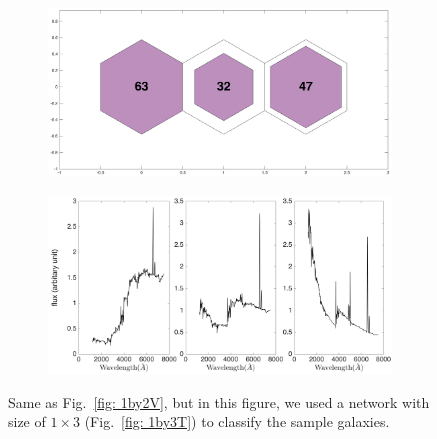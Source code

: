            \begin{figure}
                \begin{subfigure}[b]{0.5\textwidth}
                    \centering
                    \includegraphics[width=\textwidth]{../image_paper2/1d/hit_v_1_by_3.png}
                \end{subfigure}
                \hfill
                \begin{subfigure}[b]{0.5\textwidth}
                     \includegraphics[width=\textwidth]{../image_paper2/1d/SED_total1by3.png}
                \end{subfigure}
                \caption{Same as Fig.~\ref{fig: 1by2V}, but in this figure, we used a network with size of $1\times3$ (Fig.~\ref{fig: 1by3T}) to classify the sample galaxies.}
                \label{fig: 1by3V}
            \end{figure}       
            
